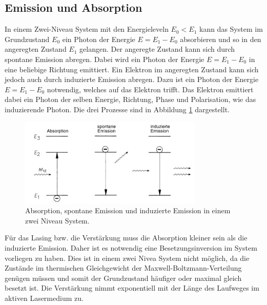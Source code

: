 \subsection{Emission und Absorption}
In einem Zwei-Niveau System mit den Energieleveln $E_0 < E_1$ kann das System im Grundzustand $E_0$ ein Photon der Energie $E = E_1 - E_0$ absorbieren und so in
den angeregten Zustand $E_1$ gelangen. Der angeregte Zustand kann sich durch spontane Emission abregen. Dabei wird ein Photon der Energie $E = E_1 - E_0$ in eine beliebige Richtung emittiert.
Ein Elektron im angeregten Zustand kann sich jedoch auch durch induzierte Emission abregen. Dazu ist ein Photon
der Energie $E = E_1 - E_0$ notwendig, welches auf das Elektron trifft.
Das Elektron emittiert dabei ein Photon der selben Energie, Richtung, Phase und Polarisation, wie das induzierende Photon.
Die drei Prozesse sind in Abbildung \ref{pic:emis} dargestellt.
\begin{figure}
    \centering
    \includegraphics[width = 0.78\textwidth]{pics/Emission.png}
    \caption{Absorption, spontane Emission und induzierte Emission in einem zwei Niveau System.\cite{Laser}}
    \label{pic:emis}
\end{figure}
Für das Lasing bzw. die Verstärkung muss die Absorption kleiner sein als die induzierte Emission. Daher ist es notwendig eine Besetzungsinversion im System vorliegen zu haben.
Dies ist in einem zwei Nivea System nicht möglich, da die Zustände im thermischen Gleichgewicht der Maxwell-Boltzmann-Verteilung genügen müssen und 
somit der Grundzustand häufiger oder maximal gleich besetzt ist. Die Verstärkung nimmt exponentiell mit der Länge des Laufweges im aktiven
Lasermedium zu.
\FloatBarrier

